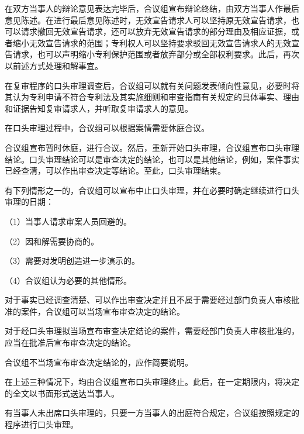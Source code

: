 在双方当事人的辩论意见表达完毕后，合议组宣布辩论终结，由双方当事人作最后意见陈述。在进行最后意见陈述时，无效宣告请求人可以坚持原无效宣告请求，也可以请求撤回无效宣告请求，还可以放弃无效宣告请求的部分理由及相应证据，或者缩小无效宣告请求的范围；专利权人可以坚持要求驳回无效宣告请求人的无效宣告请求，也可以声明缩小专利保护范围或者放弃部分或全部权利要求。此后，再次以前述方式处理和解事宜。

在复审程序的口头审理调查后，合议组可以就有关问题发表倾向性意见，必要时将其认为专利申请不符合专利法及其实施细则和审查指南有关规定的具体事实、理由和证据告知复审请求人，并听取复审请求人的意见。

在口头审理过程中，合议组可以根据案情需要休庭合议。

合议组宣布暂时休庭，进行合议。然后，重新开始口头审理，合议组宣布口头审理结论。口头审理结论可以是审查决定的结论，也可以是其他结论，例如，案件事实已经查清，可以作出审查决定等结论。至此，口头审理结束。

有下列情形之一的，合议组可以宣布中止口头审理，并在必要时确定继续进行口头审理的日期：

{\setlength{\parindent}{17.1bp}（1）当事人请求审案人员回避的。\par}

{\setlength{\parindent}{17.1bp}（2）因和解需要协商的。\par}

{\setlength{\parindent}{17.1bp}（3）需要对发明创造进一步演示的。\par}

{\setlength{\parindent}{17.1bp}（4）合议组认为必要的其他情形。\par}

对于事实已经调查清楚、可以作出审查决定并且不属于需要经过部门负责人审核批准的案件，合议组可以当场宣布审查决定的结论。

对于经口头审理拟当场宣布审查决定结论的案件，需要经部门负责人审核批准的，应当在批准后宣布审查决定的结论。

合议组不当场宣布审查决定结论的，应作简要说明。

在上述三种情况下，均由合议组宣布口头审理终止。此后，在一定期限内，将决定的全文以书面形式送达当事人。

有当事人未出席口头审理的，只要一方当事人的出庭符合规定，合议组按照规定的程序进行口头审理。

